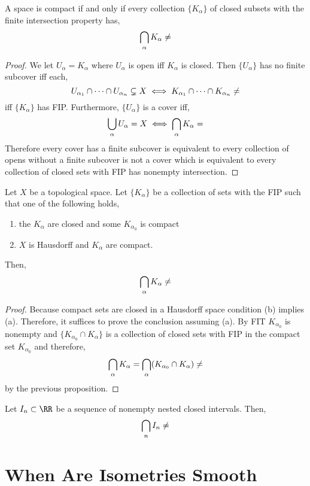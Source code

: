 \documentclass[12pt]{article}
\begin{document}
\begin{prop}
A space is compact if and only if every collection $\{ K_\alpha \}$ of closed subsets with the finite intersection property has,
\[ \bigcap_{\alpha} K_\alpha \neq \empty \]
\end{prop}

\begin{proof}
We let $U_\alpha = K_\alpha$ where $U_\alpha$ is open iff $K_\alpha$ is closed. Then $\{ U_\alpha \}$ has no finite subcover iff each,
\[ U_{\alpha_1} \cap \cdots \cap U_{\alpha_n} \subsetneq X \iff K_{\alpha_1} \cap \cdots \cap K_{\alpha_n} \neq \empty \]
iff $\{ K_\alpha \}$ has FIP. Furthermore, $\{ U_\alpha \}$ is a cover iff,
\[ \bigcup_\alpha U_\alpha = X \iff \bigcap_\alpha K_\alpha = \empty\]
Therefore every cover has a finite subcover is equivalent to every collection of opens without a finite subcover is not a cover which is equivalent to every collection of closed sets with FIP has nonempty intersection. 
\end{proof}

\begin{prop}
Let $X$ be a topological space. Let $\{ K_\alpha \}$ be a collection of sets with the FIP such that one of the following holds,
\begin{enumerate}
\item the $K_\alpha$ are closed and some $K_{\alpha_0}$ is compact
\item $X$ is Hausdorff and $K_\alpha$ are compact.
\end{enumerate}
Then,
\[ \bigcap_{\alpha} K_\alpha \neq \empty \]
\end{prop}

\begin{proof}
Because compact sets are closed in a Hausdorff space condition (b) implies (a). Therefore, it suffices to prove the conclusion assuming (a). By FIT $K_{\alpha_0}$ is nonempty and $\{ K_{\alpha_0} \cap K_{\alpha} \}$ is a collection of closed sets with FIP in the compact set $K_{\alpha_0}$ and therefore,
\[ \bigcap_{\alpha} K_\alpha = \bigcap_{\alpha} (K_{\alpha_0} \cap K_{\alpha} ) \neq \empty \]
by the previous proposition.
\end{proof}

\begin{cor}
Let $I_n \subset \RR$ be a sequence of nonempty nested closed intervals. Then,
\[ \bigcap_n I_n \neq \empty \]
\end{cor}

\section{When Are Isometries Smooth}
\end{document}
